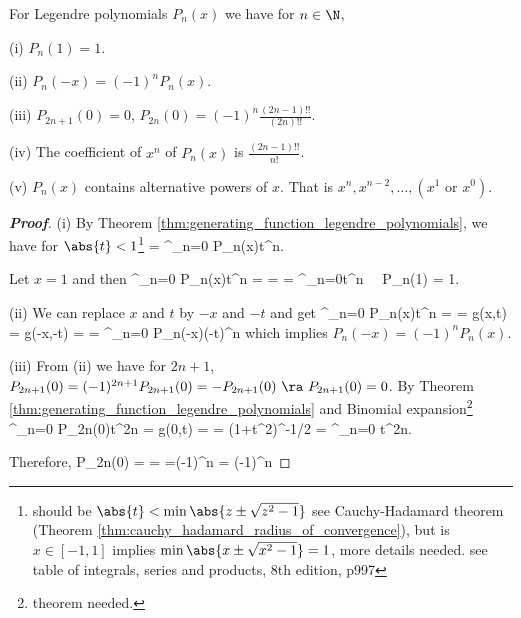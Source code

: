 \begin{proposition}\label{pro:legendre_polynomials_value}
For Legendre polynomials $P_n(x)$ we have for $n\in \N$,
\ben
\item [(i)] $P_n(1)=1$.
\item [(ii)] $P_{n}(-x) = (-1)^nP_n(x)$.
\item [(iii)] $P_{2n+1}(0) = 0$, $P_{2n}(0) = (-1)^n\frac{(2n-1)!!}{(2n)!!}$.
\item [(iv)] The coefficient of $x^n$ of $P_n(x)$ is $\frac{(2n-1)!!}{n!}$.
\item [(v)] $P_n(x)$ contains alternative powers of $x$. That is $x^n,x^{n-2},\dots, (x^1\text{ or }x^0)$.
\een
\end{proposition}


\begin{proof}[\bf Proof]
\ben
\item [(i)] By Theorem \ref{thm:generating_function_legendre_polynomials}, we have for $\abs{t}<1$\footnote{should be $\abs{t}<\min\abs{z\pm \sqrt{z^2-1}}$ see Cauchy-Hadamard theorem (Theorem \ref{thm:cauchy_hadamard_radius_of_convergence}), but is $x\in [-1,1]$ implies $\min\abs{x\pm \sqrt{x^2-1}}=1$, more details needed. see table of integrals, series and products, 8th edition, p997}
\be
{} = \sum^\infty_{n=0} P_n(x)t^n.
\ee

Let $x=1$ and then
\be
\sum^\infty_{n=0} P_n(x)t^n =  =  = \sum^\infty_{n=0}t^n \ \ra\ P_n(1) = 1.
\ee

\item [(ii)] We can replace $x$ and $t$ by $-x$ and $-t$ and get
\be
\sum^\infty_{n=0} P_n(x)t^n =  = g(x,t) = g(-x,-t) =  = \sum^\infty_{n=0} P_n(-x)(-t)^n
\ee
which implies $P_n(-x) = (-1)^n P_n(x)$.

\item [(iii)] From (ii) we have for $2n+1$, $P_{2n+1}(0) = (-1)^{2n+1}P_{2n+1}(0) = -P_{2n+1}(0)\ \ra\ P_{2n+1}(0) = 0$. By Theorem \ref{thm:generating_function_legendre_polynomials} and Binomial expansion\footnote{theorem needed.}
    \be
    \sum^\infty_{n=0} P_{2n}(0)t^{2n} = g(0,t) =  = (1+t^2)^{-1/2} = \sum^\infty_{n=0}  t^{2n}.
    \ee

Therefore,
\beast
P_{2n}(0) =  = =(-1)^n  = (-1)^n 
\eeast


\end{proof}
